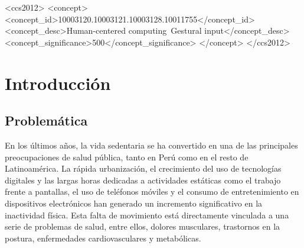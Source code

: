 \documentclass[manuscript,screen,review]{acmart}
\begin{document}
\begin{CCSXML}
<ccs2012>
   <concept>
       <concept_id>10003120.10003121.10003128.10011755</concept_id>
       <concept_desc>Human-centered computing~Gestural input</concept_desc>
       <concept_significance>500</concept_significance>
       </concept>
 </ccs2012>
\end{CCSXML}



\maketitle


\section{Introducción}

\subsection{Problemática}
En los últimos años, la vida sedentaria se ha convertido en una de las principales preocupaciones de salud pública, tanto en Perú como en el resto de Latinoamérica. La rápida urbanización, el crecimiento del uso de tecnologías digitales y las largas horas dedicadas a actividades estáticas como el trabajo frente a pantallas, el uso de teléfonos móviles y el consumo de entretenimiento en dispositivos electrónicos han generado un incremento significativo en la inactividad física. Esta falta de movimiento está directamente vinculada a una serie de problemas de salud, entre ellos, dolores musculares, trastornos en la postura, enfermedades cardiovasculares y metabólicas.
\end{document}
